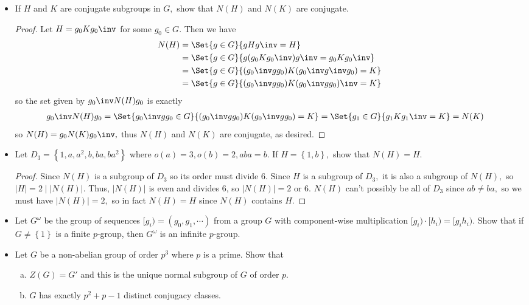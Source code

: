 \documentclass{article}
\begin{document}
\begin{itemize}
	\item[7.] If $H$ and $K$ are conjugate subgroups in $G,$ show that $N(H)$ and $N(K)$ are conjugate.
		\begin{proof}
			Let $H=g_0 K g_0\inv$ for some $g_0\in G.$ Then we have
			\begin{align*}
				N(H) &= \Set{g\in G}{gHg\inv=H} \\
				&= \Set{g\in G}{g(g_0 Kg_0\inv)g\inv = g_0 Kg_0\inv} \\
				&= \Set{g\in G}{(g_0\inv gg_0) K (g_0\inv g\inv g_0) = K} \\
				&= \Set{g\in G}{(g_0\inv gg_0) K (g_0\inv gg_0)\inv = K}
			\end{align*} so the set given by $g_0\inv N(H) g_0$ is exactly
			\begin{align*}
				g_0\inv N(H) g_0 &= \Set{g_0\inv gg_0 \in G}{(g_0\inv gg_0) K(g_0\inv gg_0)=K} = \Set{g_1\in G}{g_1 K g_1\inv = K} = N(K)
			\end{align*} so $N(H)=g_0 N(K) g_0\inv,$ thus $N(H)$ and $N(K)$ are conjugate, as desired.
			
		\end{proof}

	\item[14.] Let $D_3=\left\{ 1, a, a^2, b, ba, ba^2 \right\}$ where $o(a)=3, o(b)=2, aba=b.$ If $H=\left\{ 1, b \right\},$ show that $N(H)=H.$
		\begin{proof}
			Since $N(H)$ is a subgroup of $D_3$ so its order must divide 6. Since $H$ is a subgroup of $D_3,$ it is also a subgroup of $N(H),$ so $|H|=2\mid |N(H)|.$ Thus, $|N(H)|$ is even and divides 6, so $|N(H)|=2$ or 6. $N(H)$ can't possibly be all of $D_3$ since $ab\neq ba,$ so we must have $|N(H)|=2,$ so in fact $N(H)=H$ since $N(H)$ contains $H.$
			
		\end{proof}

	\item[23.] Let $G^{\omega}$ be the group of sequences $[g_i)=(g_0, g_1, \cdots)$ from a group $G$ with component-wise multiplication $[g_i)\cdot [h_i)=[g_ih_i).$ Show that if $G\neq \left\{ 1 \right\}$ is a finite $p$-group, then $G^{\omega}$ is an infinite $p$-group.

	\item[26.] Let $G$ be a non-abelian group of order $p^3$ where $p$ is a prime. Show that
		\begin{enumerate}[(a)]
			\item $Z(G)=G'$ and this is the unique normal subgroup of $G$ of order $p.$

			\item $G$ has exactly $p^2+p-1$ distinct conjugacy classes.
				
		\end{enumerate}
		
\end{itemize}
\end{document}
